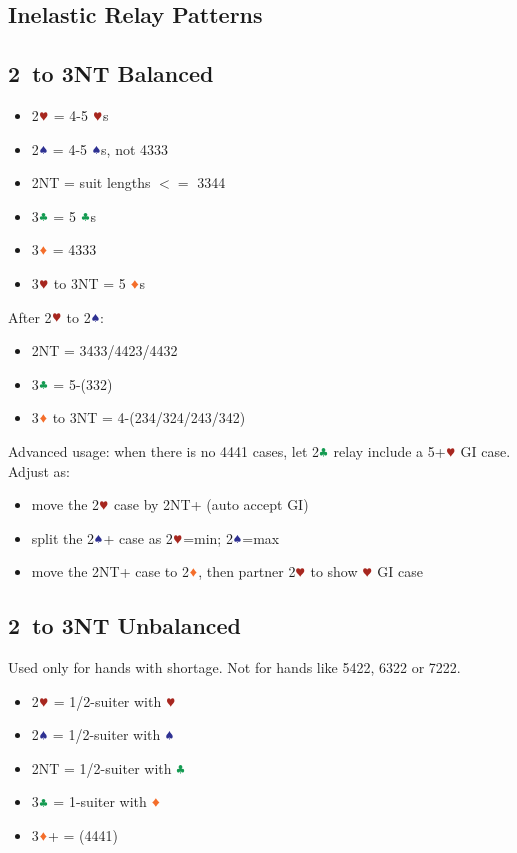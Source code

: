 \documentclass{article}
\begin{document}
\begin{multicols}{2}
\begin{CJK*}{UTF8}{gt}
\section{Inelastic Relay Patterns}

\subsection{2\HHH\ to 3NT Balanced}
\label{sec:2h-3nt-bal}

\begin{itemize}
    \item 2$\hhh$ = 4-5 $\hhh$s
    \item 2$\sss$ = 4-5 $\sss$s, not 4333
    \item 2NT = suit lengths $<=$ 3344
    \item 3$\ccc$ = 5 $\ccc$s
    \item 3$\ddd$ = 4333
    \item 3$\hhh$ to 3NT = 5 $\ddd$s
\end{itemize}
\vspace{1em}

\noindent After 2$\hhh$ to 2$\sss$:
\begin{itemize}
    \item 2NT = 3433/4423/4432
    \item 3$\ccc$ = 5-(332)
    \item 3$\ddd$ to 3NT = 4-(234/324/243/342)
\end{itemize}
\vspace{1em}

\noindent Advanced usage: when there is no 4441 cases, let 2$\ccc$ relay include a 5+$\hhh$ GI case. Adjust as:
\begin{itemize}
    \item move the 2$\hhh$ case by 2NT+ (auto accept GI)
    \item split the 2$\sss$+ case as 2$\hhh$=min; 2$\sss$=max
    \item move the 2NT+ case to 2$\ddd$, then partner 2$\hhh$ to show $\hhh$ GI case
\end{itemize}

\subsection{2\HHH\ to 3NT Unbalanced}
\label{sec:2h-3nt-unbal}
Used only for hands with shortage. Not for hands like 5422, 6322 or 7222.

\begin{itemize}
    \item 2$\hhh$ = 1/2-suiter with $\hhh$
    \item 2$\sss$ = 1/2-suiter with $\sss$
    \item 2NT = 1/2-suiter with $\ccc$
    \item 3$\ccc$ = 1-suiter with $\ddd$
    \item 3$\ddd$+ = (4441)
\end{itemize}
\vspace{1em}


\end{CJK*}
\end{multicols}
\end{document}
